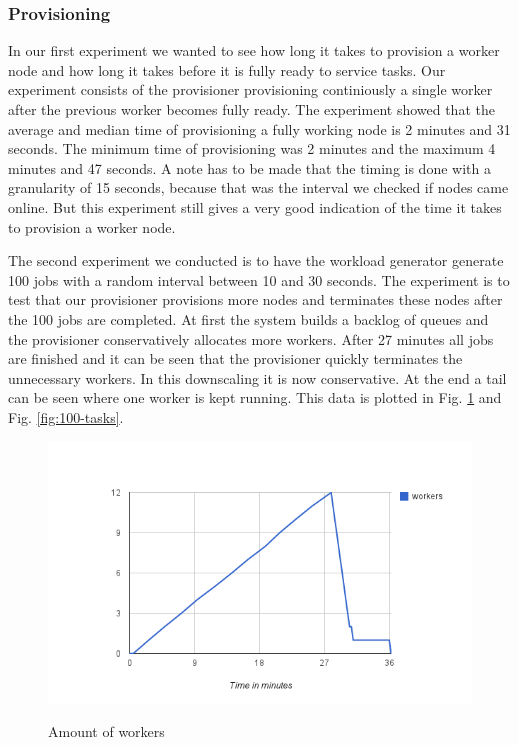 \documentclass[a4paper]{IEEEtran}
\begin{document}
\subsubsection{Provisioning}
In our first experiment we wanted to see how long it takes to provision a worker node and how long it takes before it is fully ready to service tasks.
Our experiment consists of the provisioner provisioning continiously a single worker after the previous worker becomes fully ready.
The experiment showed that the average and median time of provisioning a fully working node is 2 minutes and 31 seconds.
The minimum time of provisioning was 2 minutes and the maximum 4 minutes and 47 seconds.
A note has to be made that the timing is done with a granularity of 15 seconds, because that was the interval we checked if nodes came online.
But this experiment still gives a very good indication of the time it takes to provision a worker node.

The second experiment we conducted is to have the workload generator generate 100 jobs with a random interval between 10 and 30 seconds.
The experiment is to test that our provisioner provisions more nodes and terminates these nodes after the 100 jobs are completed.
At first the system builds a backlog of queues and the provisioner conservatively allocates more workers.
After 27 minutes all jobs are finished and it can be seen that the provisioner quickly terminates the unnecessary workers.
In this downscaling it is now conservative.
At the end a tail can be seen where one worker is kept running.
This data is plotted in Fig. \ref{fig:100-workers} and Fig. \ref{fig:100-tasks}.

\begin{figure}[ht]
	\includegraphics[scale=0.5]{fig/100workers.png}
	\label{fig:100-workers}
	\caption{Amount of workers}
\end{figure}
\end{document}
